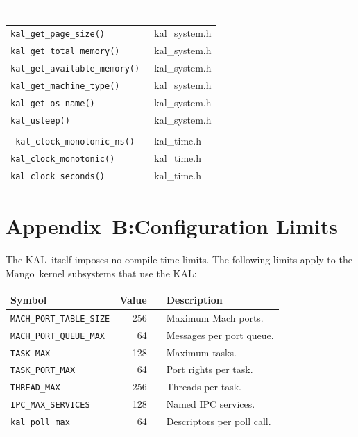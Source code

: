 \documentclass[11pt,twoside]{article}
\newcommand{\KAL}{KAL}
\newcommand{\Mango}{Mango}
\begin{document}
\begin{longtable}{>{\tt}l l}
\multicolumn{2}{l}{\bf System} \\
\hline
kal\_get\_page\_size()          & kal\_system.h \\
kal\_get\_total\_memory()       & kal\_system.h \\
kal\_get\_available\_memory()   & kal\_system.h \\
kal\_get\_machine\_type()       & kal\_system.h \\
kal\_get\_os\_name()            & kal\_system.h \\
kal\_usleep()                   & kal\_system.h \\
\hline

\multicolumn{2}{l}{\bf Timing} \\
\hline
kal\_clock\_monotonic\_ns()  & kal\_time.h \\
kal\_clock\_monotonic()      & kal\_time.h \\
kal\_clock\_seconds()        & kal\_time.h \\
\hline

\end{longtable}

\section*{Appendix~B:\quad Configuration Limits}

The \KAL\ itself imposes no compile-time limits.  The following
limits apply to the \Mango\ kernel subsystems that use the \KAL:

\bigskip
\noindent
\begin{tabularx}{\textwidth}{lrlX}
\hline
\bf Symbol & \bf Value & & \bf Description \\
\hline
{\tt MACH\_PORT\_TABLE\_SIZE} & 256 & & Maximum Mach ports. \\
{\tt MACH\_PORT\_QUEUE\_MAX}  & 64  & & Messages per port queue. \\
{\tt TASK\_MAX}               & 128 & & Maximum tasks. \\
{\tt TASK\_PORT\_MAX}         & 64  & & Port rights per task. \\
{\tt THREAD\_MAX}             & 256 & & Threads per task. \\
{\tt IPC\_MAX\_SERVICES}      & 128 & & Named IPC services. \\
{\tt kal\_poll max}           & 64  & & Descriptors per poll call. \\
\hline
\end{tabularx}
\end{document}
